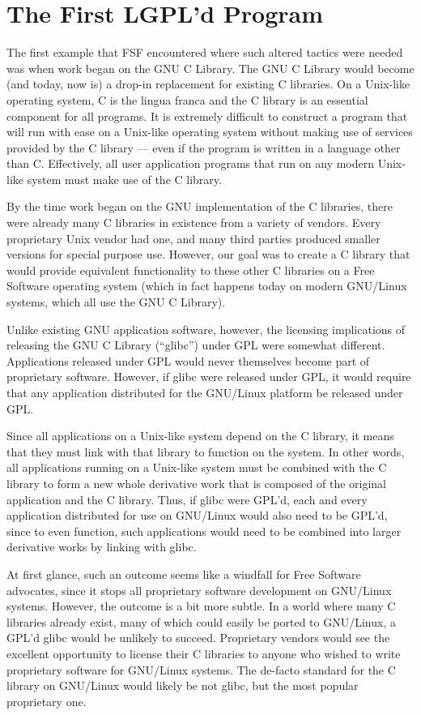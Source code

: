 \documentclass[11pt, letterpaper]{book}
\begin{document}
\section{The First LGPL'd Program}

The first example that FSF encountered where such altered tactics were
needed was when work began on the GNU C Library. The GNU C Library would
become (and today, now is) a drop-in replacement for existing C libraries.
On a Unix-like operating system, C is the lingua franca and the C library
is an essential component for all programs. It is extremely difficult to
construct a program that will run with ease on a Unix-like operating
system without making use of services provided by the C library --- even
if the program is written in a language other than C\@. Effectively, all
user application programs that run on any modern Unix-like system must
make use of the C library.

By the time work began on the GNU implementation of the C libraries, there
were already many C libraries in existence from a variety of vendors.
Every proprietary Unix vendor had one, and many third parties produced
smaller versions for special purpose use. However, our goal was to create
a C library that would provide equivalent functionality to these other C
libraries on a Free Software operating system (which in fact happens today
on modern GNU/Linux systems, which all use the GNU C Library).

Unlike existing GNU application software, however, the licensing
implications of releasing the GNU C Library (``glibc'') under GPL were
somewhat different. Applications released under GPL would never
themselves become part of proprietary software. However, if glibc were
released under GPL, it would require that any application distributed for
the GNU/Linux platform be released under GPL\@.

Since all applications on a Unix-like system depend on the C library, it
means that they must link with that library to function on the system. In
other words, all applications running on a Unix-like system must be
combined with the C library to form a new whole derivative work that is
composed of the original application and the C library. Thus, if glibc
were GPL'd, each and every application distributed for use on GNU/Linux
would also need to be GPL'd, since to even function, such applications
would need to be combined into larger derivative works by linking with
glibc.

At first glance, such an outcome seems like a windfall for Free Software
advocates, since it stops all proprietary software development on
GNU/Linux systems. However, the outcome is a bit more subtle. In a world
where many C libraries already exist, many of which could easily be ported
to GNU/Linux, a GPL'd glibc would be unlikely to succeed. Proprietary
vendors would see the excellent opportunity to license their C libraries
to anyone who wished to write proprietary software for GNU/Linux systems.
The de-facto standard for the C library on GNU/Linux would likely be not
glibc, but the most popular proprietary one.
\end{document}
